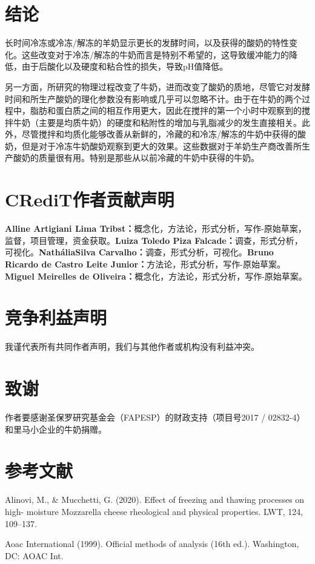 \documentclass[twocolumn]{ctexart}
\begin{document}
\section{结论}
长时间冷冻或冷冻/解冻的羊奶显示更长的发酵时间，以及获得的酸奶的特性变化。这些改变对于冷冻/解冻的牛奶而言是特别不希望的，这导致缓冲能力的降低，由于后酸化以及硬度和粘合性的损失，导致pH值降低。

另一方面，所研究的物理过程改变了牛奶，进而改变了酸奶的质地，尽管它对发酵时间和所生产酸奶的理化参数没有影响或几乎可以忽略不计。由于在牛奶的两个过程中，脂肪和蛋白质之间的相互作用更大，因此在搅拌的第一个小时中观察到的搅拌牛奶（主要是均质牛奶）的硬度和粘附性的增加与乳脂减少的发生直接相关。此外，尽管搅拌和均质化能够改善从新鲜的，冷藏的和冷冻/解冻的牛奶中获得的酸奶，但是对于冷冻牛奶酸奶观察到更大的效果。这些数据对于羊奶生产商改善所生产酸奶的质量很有用。特别是那些从以前冷藏的牛奶中获得的牛奶。

\section*{CRediT作者贡献声明}
\textbf{Alline Artigiani Lima Tribst：}概念化，方法论，形式分析，写作-原始草案，监督，项目管理，资金获取。\textbf{Luiza Toledo Piza Falcade：}调查，形式分析，可视化。\textbf{NatháliaSilva Carvalho：}调查，形式分析，可视化。\textbf{Bruno Ricardo de Castro Leite Junior：}方法论，形式分析，写作-原始草案。\textbf{Miguel Meirelles de Oliveira：}概念化，方法论，形式分析，写作-原始草案。

\section*{竞争利益声明}
我谨代表所有共同作者声明，我们与其他作者或机构没有利益冲突。

\section*{致谢}
作者要感谢圣保罗研究基金会（FAPESP）的财政支持（项目号2017 / 02832-4）和里马小企业的牛奶捐赠。

\section*{参考文献}
\small
Alinovi, M., \& Mucchetti, G. (2020). Effect of freezing and thawing processes on high-
moisture Mozzarella cheese rheological and physical properties. LWT, 124, 109–137.

Aoac International (1999). Official methods of analysis (16th ed.). Washington, DC: AOAC
Int.
\end{document}
